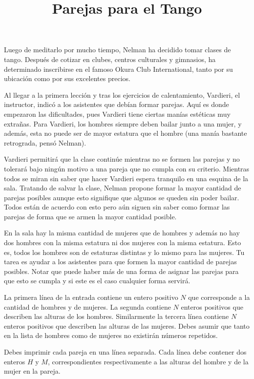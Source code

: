 \documentclass{oci}
\title{Parejas para el Tango}
\begin{document}
\begin{problemDescription}
Luego de meditarlo por mucho tiempo, Nelman ha decidido tomar clases de tango.
Después de cotizar en clubes, centros culturales y gimnasios, ha determinado inscribirse en el famoso Okura Club International, tanto por su ubicación como por sus excelentes precios.

Al llegar a la primera lección y tras los ejercicios de calentamiento, Vardieri, el instructor, indicó a los asistentes que debían formar parejas.
Aquí es donde empezaron las dificultades, pues Vardieri tiene ciertas manías estéticas muy extrañas.
Para Vardieri, los hombres siempre deben bailar junto a una mujer, y además, esta no puede ser de mayor estatura que el hombre (una manía bastante retrograda, pensó Nelman).

Vardieri permitirá que la clase continúe mientras no se formen las parejas y no tolerará bajo ningún motivo a una pareja que no cumpla con su criterio.
Mientras todos se miran sin saber que hacer Vardieri espera tranquilo en una esquina de la sala.
Tratando de salvar la clase, Nelman propone formar la mayor cantidad de parejas posibles aunque esto signifique que algunos se queden sin poder bailar.
Todos están de acuerdo con esto pero aún siguen sin saber como formar las parejas de forma que se armen la mayor cantidad posible.

En la sala hay la misma cantidad de mujeres que de hombres y además no hay dos hombres con la misma estatura ni dos mujeres con la misma estatura.
Esto es, todos los hombres son de estaturas distintas y lo mismo para las mujeres.
Tu tarea es ayudar a los asistentes para que formen la mayor cantidad de parejas posibles.
Notar que puede haber más de una forma de asignar las parejas para que esto se cumpla y si este es el caso cualquier forma servirá.

\end{problemDescription}

\begin{inputDescription}
La primera línea de la entrada contiene un entero positivo $N$ que corresponde a la cantidad de hombres y de mujeres.
La segunda contiene $N$ enteros positivos que describen las alturas de los hombres.
Similarmente la tercera línea contiene $N$ enteros positivos que describen las alturas de las mujeres.
Debes asumir que tanto en la lista de hombres como de mujeres no existirán números repetidos.
\end{inputDescription}

\begin{outputDescription}
Debes imprimir cada pareja en una línea separada.
Cada línea debe contener dos enteros $H$ y $M$, correspondientes respectivamente a las alturas del hombre y de la mujer en la pareja.
\end{outputDescription}
\end{document}
